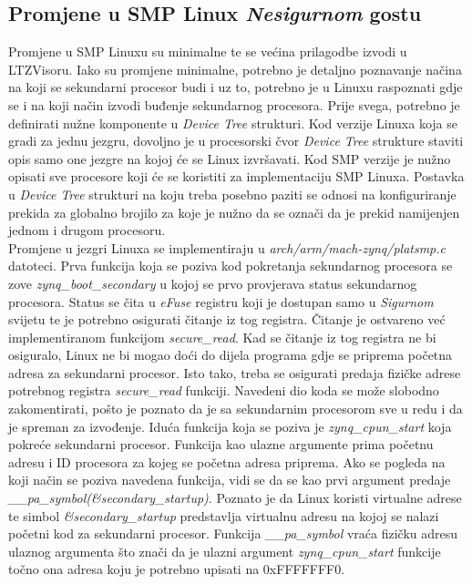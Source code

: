 \documentclass[times, utf8, diplomski, numeric]{fer}
\begin{document}
\subsection{Promjene u SMP Linux \textit{Nesigurnom} gostu}
Promjene u SMP Linuxu su minimalne te se većina prilagodbe izvodi u LTZVisoru. Iako su promjene minimalne, potrebno je detaljno
poznavanje načina na koji se sekundarni procesor budi i uz to, potrebno je u Linuxu raspoznati gdje se i na koji način izvodi
buđenje sekundarnog procesora. Prije svega, potrebno je definirati nužne komponente u \textit{Device Tree} strukturi. Kod
verzije Linuxa koja se gradi za jednu jezgru, dovoljno je u procesorski čvor \textit{Device Tree} strukture staviti opis
samo one jezgre na kojoj će se Linux izvršavati. Kod SMP verzije je nužno opisati sve procesore koji će se koristiti za
implementaciju SMP Linuxa. Postavka u \textit{Device Tree} strukturi na koju treba posebno paziti se odnosi na konfiguriranje
prekida za globalno brojilo za koje je nužno da se označi da je prekid namijenjen jednom i drugom procesoru.\\
Promjene u jezgri Linuxa se implementiraju u \textit{arch/arm/mach-zynq/platsmp.c} datoteci. Prva funkcija koja se poziva
kod pokretanja sekundarnog procesora se zove \textit{zynq\_boot\_secondary} u kojoj se prvo provjerava status sekundarnog
procesora. Status se čita u \textit{eFuse} registru koji je dostupan samo u \textit{Sigurnom} svijetu te je potrebno
osigurati čitanje iz tog registra. Čitanje je ostvareno već implementiranom funkcijom \textit{secure\_read}. Kad se čitanje
iz tog registra ne bi osiguralo, Linux ne bi mogao doći do dijela programa gdje se priprema početna adresa za sekundarni
procesor. Isto tako, treba se osigurati predaja fizičke adrese potrebnog registra \textit{secure\_read} funkciji. Navedeni
dio koda se može slobodno zakomentirati, pošto je poznato da je sa sekundarnim procesorom sve u redu i da je spreman za
izvođenje. Iduća funkcija koja se poziva je \textit{zynq\_cpun\_start} koja pokreće sekundarni procesor. Funkcija kao ulazne
argumente prima početnu adresu i ID procesora za kojeg se početna adresa priprema. Ako se pogleda na koji način se poziva
navedena funkcija, vidi se da se kao prvi argument predaje \textit{\_\_pa\_symbol(\&secondary\_startup)}. Poznato je da Linux
koristi virtualne adrese te simbol \textit{\&secondary\_startup} predstavlja virtualnu adresu na kojoj se nalazi početni kod
za sekundarni procesor. Funkcija \textit{\_\_pa\_symbol} vraća fizičku adresu ulaznog argumenta što znači da je ulazni argument
\textit{zynq\_cpun\_start} funkcije točno ona adresa koju je potrebno upisati na 0xFFFFFFF0.\\
\end{document}
